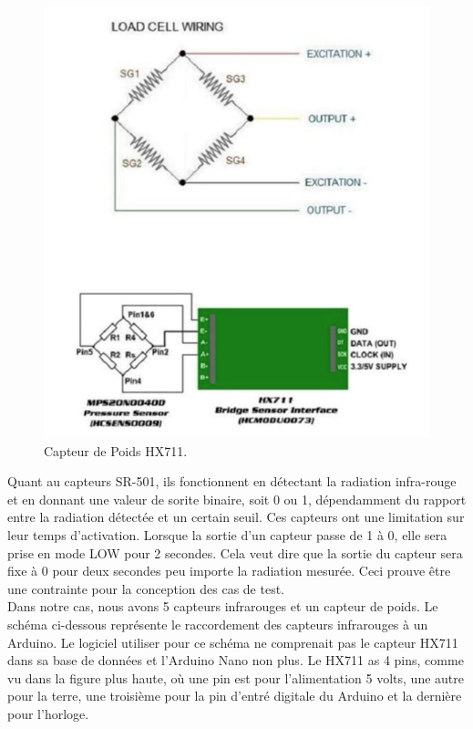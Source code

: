 \documentclass[journal]{IEEEtran}
\begin{document}
\begin{figure}[htbp]
    \centerline{\includegraphics{hardware1.png}}
    \caption{Capteur de Poids HX711.\cite{b3}}
    \label{fig1}
\end{figure} 

Quant au capteurs SR-501, ils fonctionnent en détectant la radiation infra-rouge et en donnant une valeur de sorite binaire, soit 0 ou 1, dépendamment du rapport entre la radiation détectée et un certain seuil. Ces capteurs ont une limitation sur leur temps d’activation. 
Lorsque la sortie d’un capteur passe de 1 à 0, elle sera prise en mode LOW pour 2 secondes. 
Cela veut dire que la sortie du capteur sera fixe à 0 pour deux secondes peu importe la radiation mesurée. Ceci prouve être une contrainte pour la conception des cas de test.\\

Dans notre cas, nous avons 5 capteurs infrarouges et un capteur de poids. 
Le schéma ci-dessous représente le raccordement des capteurs infrarouges à un Arduino. 
Le logiciel utiliser pour ce schéma ne comprenait pas le capteur HX711 dans sa base de données et l’Arduino Nano non plus. Le HX711 as 4 pins, comme vu dans la figure plus haute, où une pin est pour l’alimentation 5 volts, une autre pour la terre, une troisième pour la pin d’entré digitale du Arduino et la dernière pour l’horloge. 
\cite{b4}
\end{document}
